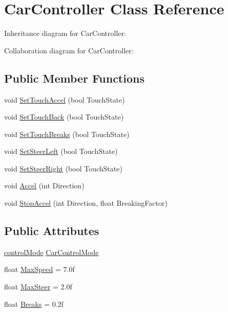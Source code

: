 \hypertarget{class_car_controller}{}\section{Car\+Controller Class Reference}
\label{class_car_controller}


Inheritance diagram for Car\+Controller\+:


Collaboration diagram for Car\+Controller\+:
\subsection*{Public Member Functions}
\begin{DoxyCompactItemize}
\item 
void \hyperlink{class_car_controller_ac889a3db559e21950d6291cfc72d072f}{Set\+Touch\+Accel} (bool Touch\+State)
\item 
void \hyperlink{class_car_controller_a653eab10dcc545076364510f8df2a2c4}{Set\+Touch\+Back} (bool Touch\+State)
\item 
void \hyperlink{class_car_controller_a367beef47c6525396ddff08c434be0be}{Set\+Touch\+Breaks} (bool Touch\+State)
\item 
void \hyperlink{class_car_controller_a4471840e4b414d910130d59abe66c2c4}{Set\+Steer\+Left} (bool Touch\+State)
\item 
void \hyperlink{class_car_controller_a05b7db4b3d87ffa872a811ec4f5e3ef1}{Set\+Steer\+Right} (bool Touch\+State)
\item 
void \hyperlink{class_car_controller_aea7ff289a093f7d8a82a4d0729663670}{Accel} (int Direction)
\item 
void \hyperlink{class_car_controller_ab0533323230d12072b41602a84c96600}{Stop\+Accel} (int Direction, float Breaking\+Factor)
\end{DoxyCompactItemize}
\subsection*{Public Attributes}
\begin{DoxyCompactItemize}
\item 
\hyperlink{_car_controller_8cs_ad8446c4cd09d94d260f08801d2bef7d2}{control\+Mode} \hyperlink{class_car_controller_a7e06bdbe46752de57aef027acbcb35c3}{Car\+Control\+Mode}
\item 
float \hyperlink{class_car_controller_a78ebb73a01931195a4b691f230bc25c1}{Max\+Speed} = 7.\+0f
\item 
float \hyperlink{class_car_controller_a465c8a231382156d7c5a9593f97b9900}{Max\+Steer} = 2.\+0f
\item 
float \hyperlink{class_car_controller_a7e13bb93d1eca2cb028b50197e26307a}{Breaks} = 0.\+2f
\end{DoxyCompactItemize}


